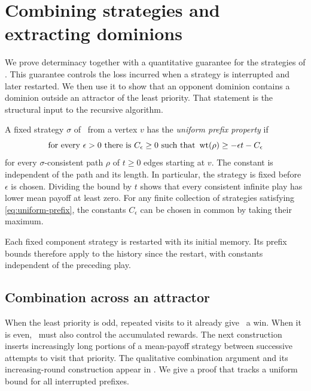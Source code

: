\section{Combining strategies and extracting dominions}
\label{sec:strategies}

We prove determinacy together with a quantitative guarantee for the
strategies of \Max.  This guarantee controls the loss incurred when a
strategy is interrupted and later restarted.  We then use it to show that
an opponent dominion contains a dominion outside an attractor of
the least priority.  That statement is the structural input to the
recursive algorithm.

A fixed strategy $\sigma$ of \Max\ from a vertex $v$ has the
\emph{uniform prefix property} if
\begin{equation}
  \label{eq:uniform-prefix}
  \text{for every }\epsilon>0\text{ there is }C_\epsilon\geq 0
  \text{ such that }\operatorname{wt}(\rho)\geq-\epsilon t-C_\epsilon
\end{equation}
for every $\sigma$-consistent path $\rho$ of $t\geq0$ edges starting at $v$.
The constant is independent of the path and its length.  In particular,
the strategy is fixed before $\epsilon$ is chosen.  Dividing the bound by
$t$ shows that every consistent infinite play has lower mean payoff at
least zero.  For any finite collection of strategies satisfying
\eqref{eq:uniform-prefix}, the constants $C_\epsilon$ can be chosen in
common by taking their maximum.

Each fixed component strategy is restarted with its initial memory.
Its prefix bounds therefore apply to the history since the restart,
with constants independent of the preceding play.

\subsection{Combination across an attractor}

When the least priority is odd, repeated visits to it already give \Min\
a win.  When it is even, \Max\ must also control the accumulated rewards.
The next construction inserts increasingly long portions of a
mean-payoff strategy between successive attempts to visit that priority.
The qualitative combination argument and its increasing-round
construction appear in
\cite[Lemma~5; full version, Lemma~7]{BouyerMarkeyOlschewskiUmmels2011}.
We give a proof that tracks a uniform bound for all interrupted prefixes.

